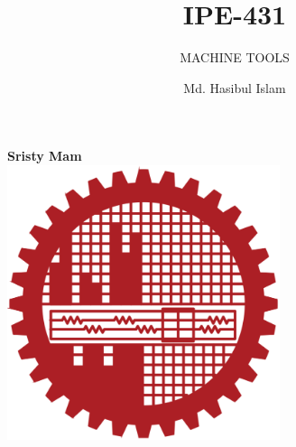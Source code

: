 \documentclass{article}
\title{IPE-431}
\author{Md. Hasibul Islam}
\subtitle{MACHINE TOOLS}
\begin{document}
\begin{titlepage}
    \centering
    
    {\Huge\bfseries\maketitle}
    \textbf{Sristy Mam} \\
    \vspace{2cm}
    \includegraphics[width=8cm]{institution_logo.jpg}
    \vfill
    \vspace*{2cm}
\end{titlepage}

\tableofcontents
\pagebreak
\end{document}
